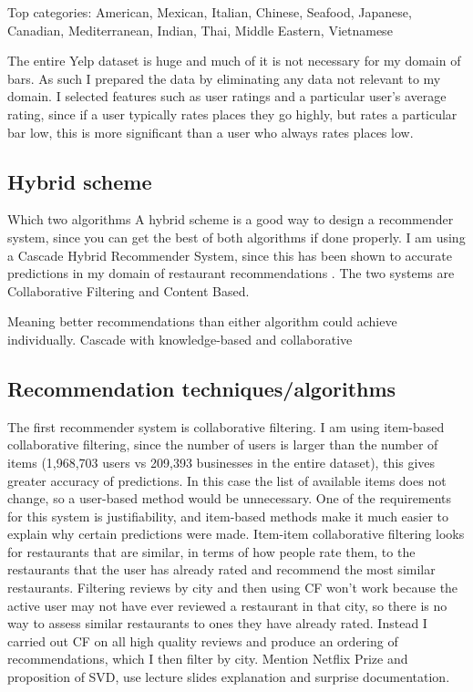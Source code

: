 \documentclass[conference]{IEEEtran}
\begin{document}
Top categories: American, Mexican, Italian, Chinese, Seafood, Japanese, Canadian, Mediterranean, Indian, Thai, Middle Eastern, Vietnamese

The entire Yelp dataset is huge and much of it is not necessary for my domain of bars.
As such I prepared the data by eliminating any data not relevant to my domain.
I selected features such as user ratings and a particular user's average rating,
since if a user typically rates places they go highly, but rates a particular bar low,
this is more significant than a user who always rates places low.

\subsection{Hybrid scheme}
Which two algorithms
A hybrid scheme is a good way to design a recommender system, since you can get the
best of both algorithms if done properly. 
I am using a Cascade Hybrid Recommender System, since this has been shown to accurate predictions 
in my domain of restaurant recommendations \cite{burke2007hybrid}. 
The two systems are Collaborative Filtering and Content Based. 

Meaning better recommendations than either algorithm could achieve individually.
Cascade with knowledge-based and collaborative


\subsection{Recommendation techniques/algorithms}
The first recommender system is collaborative filtering.
I am using item-based collaborative filtering, since the number of users is larger than the number of items 
(1,968,703 users vs 209,393 businesses in the entire dataset), this gives greater accuracy of predictions. 
In this case the list of available items does not change, so a user-based method would be unnecessary. 
One of the requirements for this system is justifiability, and item-based methods make it much easier to 
explain why certain predictions were made. 
Item-item collaborative filtering looks for restaurants that are similar, in terms of how people rate them, 
to the restaurants that the user has already rated and recommend the most similar restaurants. 
Filtering reviews by city and then using CF won't work because the active user may not have ever reviewed a restaurant 
in that city, so there is no way to assess similar restaurants to ones they have already rated. 
Instead I carried out CF on all high quality reviews and produce an ordering of recommendations, which I then filter 
by city. 
Mention Netflix Prize and proposition of SVD, use lecture slides explanation and surprise documentation. 
\end{document}

